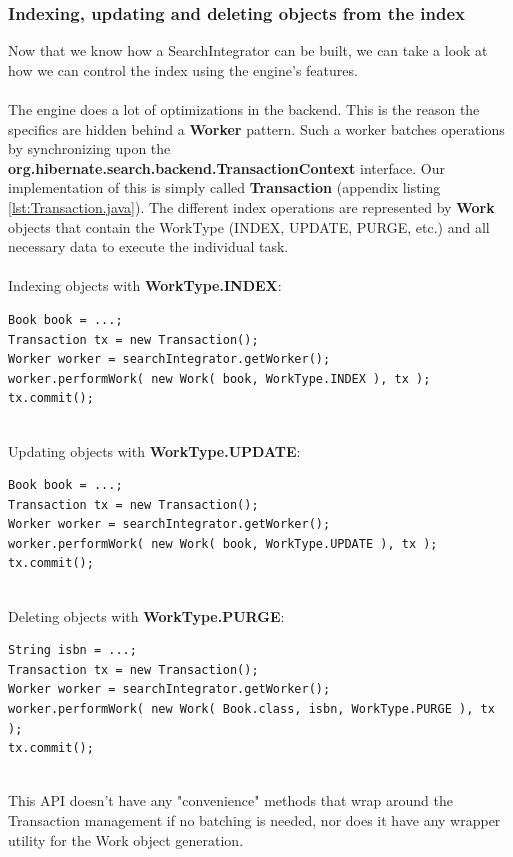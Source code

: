 \subsubsection{Indexing, updating and deleting objects from the index}

Now that we know how a SearchIntegrator can be built, we can take a look at how we can control the index using the engine's features. 
\\\\
The engine does a lot of optimizations in the backend. This is the reason the specifics are hidden behind a \textbf{Worker} pattern. Such a worker batches operations by synchronizing upon the \textbf{org.hibernate.search.backend.TransactionContext} interface. Our implementation of this is simply called \textbf{Transaction} (appendix listing \ref{lst:Transaction.java}). The different index operations are represented by \textbf{Work} objects that contain the WorkType (INDEX, UPDATE, PURGE, etc.) and all necessary data to execute the individual task.
\\\\
Indexing objects with \textbf{WorkType.INDEX}:
\\
\lstset{language=java}
\begin{lstlisting}[frame=htrbl, caption={Indexing an object with the engine}, label={lst:indexing_object_native.java}]
Book book = ...;
Transaction tx = new Transaction();
Worker worker = searchIntegrator.getWorker();
worker.performWork( new Work( book, WorkType.INDEX ), tx );
tx.commit();
\end{lstlisting}
~\\
Updating objects with \textbf{WorkType.UPDATE}:
\\
\lstset{language=java}
\begin{lstlisting}[frame=htrbl, caption={Updating an object with the engine}, label={lst:updating_object_native.java}]
Book book = ...;
Transaction tx = new Transaction();
Worker worker = searchIntegrator.getWorker();
worker.performWork( new Work( book, WorkType.UPDATE ), tx );
tx.commit();
\end{lstlisting}
~\\
Deleting objects with \textbf{WorkType.PURGE}:
\\
\lstset{language=java}
\begin{lstlisting}[frame=htrbl, caption={Deleting an object by id with the engine}, label={lst:deleting_object_native.java}]
String isbn = ...;
Transaction tx = new Transaction();
Worker worker = searchIntegrator.getWorker();
worker.performWork( new Work( Book.class, isbn, WorkType.PURGE ), tx );
tx.commit();
\end{lstlisting}
~\\
This API doesn't have any "convenience" methods that wrap around the Transaction management if no batching is needed, nor does it have any wrapper utility for the Work object generation.

